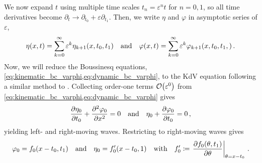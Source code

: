 \documentclass{jfm}
\renewcommand*{\epsilon}{\varepsilon}
\begin{document}
We now expand $t$ using multiple time scales $t_n =
\epsilon^n t$ for $n= 0,1$, so all time derivatives become $\partial_t \to
\partial_{t_0} + \epsilon \partial_{t_1}$.
Then, we write $\eta$ and $\varphi$ in asymptotic series of $\epsilon$,
\begin{equation}
  \eta(x,t) = \sum_{k=0}^{\infty} \epsilon^k
    \eta_{k+1}(x,t_0,t_1) \qq{and}
  \varphi(x,t) = \sum_{k=0}^{\infty} \epsilon^k
    \varphi_{k+1}(x,t_0,t_1,) \,.
\end{equation}
Now, we will reduce the Boussinesq equations,
\cref{eq:kinematic_bc_varphi,eq:dynamic_bc_varphi}, to the KdV equation
following a similar method to \citet{mei2005nonlinear}.
Collecting order-one terms $\order{\epsilon^0}$ from
\cref{eq:kinematic_bc_varphi,eq:dynamic_bc_varphi} gives
\begin{equation}
  \pdv{\eta_0}{t_0} + \pdv[2]{\varphi_0}{x} = 0 \qq{and}
  \eta_0 + \pdv{\varphi_0}{t_0} = 0 \,,
\end{equation}
yielding left- and right-moving waves.
Restricting to right-moving waves gives
\begin{equation}
  \varphi_0 = f_0(x-t_0,t_1) \qq{and}
  \eta_0 = f'_0(x-t_0,1) \qq{with}
  f_0' \coloneqq \eval{\pdv{f_0(\theta,t_1)}{\theta}}_{\theta = x-t_0} \,.
\end{equation}
\end{document}
